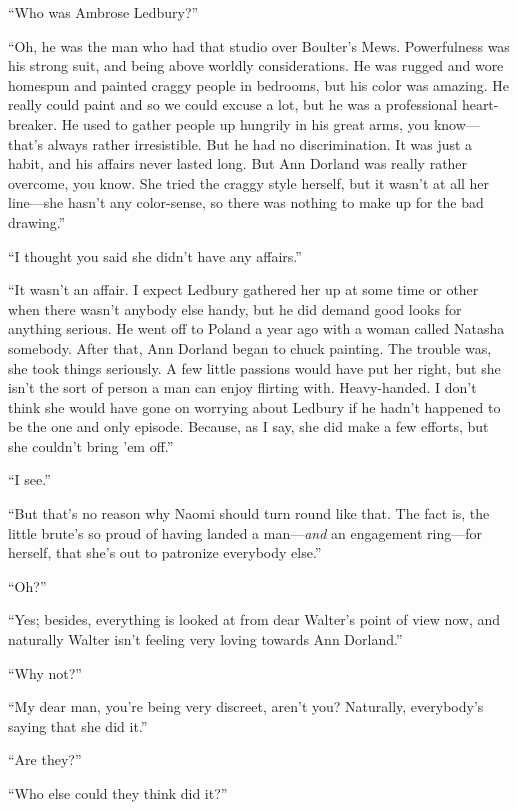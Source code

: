 \enquote{Who was Ambrose Ledbury?}

\enquote{Oh, he was the man who had that studio over Boulter's Mews. Powerfulness was his strong suit, and being above worldly considerations. He was rugged and wore homespun and painted craggy people in bedrooms, but his color was amazing. He really could paint and so we could excuse a lot, but he was a professional heart-breaker. He used to gather people up hungrily in his great arms, you know\allowbreak---\allowbreak that's always rather irresistible. But he had no discrimination. It was just a habit, and his affairs never lasted long. But Ann Dorland was really rather overcome, you know. She tried the craggy style herself, but it wasn't at all her line\allowbreak---\allowbreak she hasn't any color-sense, so there was nothing to make up for the bad drawing.}

\enquote{I thought you said she didn't have any affairs.}

\enquote{It wasn't an affair. I expect Ledbury gathered her up at some time or other when there wasn't anybody else handy, but he did demand good looks for anything serious. He went off to Poland a year ago with a woman called Natasha somebody. After that, Ann Dorland began to chuck painting. The trouble was, she took things seriously. A few little passions would have put her right, but she isn't the sort of person a man can enjoy flirting with. Heavy-handed. I don't think she would have gone on worrying about Ledbury if he hadn't happened to be the one and only episode. Because, as I say, she did make a few efforts, but she couldn't bring 'em off.}

\enquote{I see.}

\enquote{But that's no reason why Naomi should turn round like that. The fact is, the little brute's so proud of having landed a man---\textit{and} an engagement ring\allowbreak---\allowbreak for herself, that she's out to patronize everybody else.}

\enquote{Oh?}

\enquote{Yes; besides, everything is looked at from dear Walter's point of view now, and naturally Walter isn't feeling very loving towards Ann Dorland.}

\enquote{Why not?}

\enquote{My dear man, you're being very discreet, aren't you? Naturally, everybody's saying that she did it.}

\enquote{Are they?}

\enquote{Who else could they think did it?}

